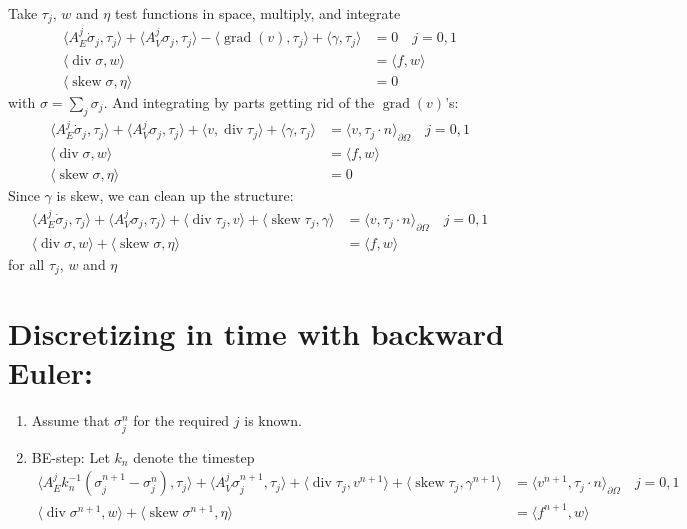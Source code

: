 \documentclass{amsart}
\DeclareMathOperator{\Div}{div}
\DeclareMathOperator{\Grad}{grad}
\DeclareMathOperator{\Skew}{skew}
\newcommand{\inner}[2]{\langle #1, #2 \rangle}
\begin{document}
Take $\tau_j$, $w$ and $\eta$ test functions in space, multiply, and
integrate
\begin{align}
  \inner{A_E^{j} \dot \sigma_j}{\tau_j} + \inner{A_{V}^{j} \sigma_j}{\tau_j} - \inner{\Grad(v)}{\tau_j} + \inner{\gamma}{\tau_j} &= 0
  \quad j = 0, 1 \\
  \inner{\Div \sigma}{w} & = \inner{f}{w} \\
  \inner{\Skew \sigma}{\eta} &= 0
\end{align}
with $\sigma = \sum_j \sigma_j$. And integrating by parts getting rid of the $\Grad(v)$'s:
\begin{align}
  \inner{A_E^{j} \dot \sigma_j}{\tau_j} + \inner{A_{V}^{j} \sigma_j}{\tau_j} + \inner{v}{\Div \tau_j} + \inner{\gamma}{\tau_j}  &= \inner{v}{\tau_j \cdot n}_{\partial \Omega}
  \quad j = 0, 1 \\
  \inner{\Div \sigma}{w} & = \inner{f}{w} \\
  \inner{\Skew \sigma}{\eta} &= 0
\end{align}
Since $\gamma$ is skew, we can clean up the structure:
\begin{align}
  \inner{A_E^{j} \dot \sigma_j}{\tau_j} + \inner{A_{V}^{j} \sigma_j}{\tau_j} + \inner{\Div \tau_j}{v} + \inner{\Skew \tau_j}{\gamma}  &= \inner{v}{\tau_j \cdot n}_{\partial \Omega}
  \quad j = 0, 1 \\
  \inner{\Div \sigma}{w} + \inner{\Skew \sigma}{\eta} & = \inner{f}{w}
\end{align}
for all $\tau_j$, $w$ and $\eta$

\section{Discretizing in time with backward Euler:}

\begin{enumerate}
\item
  Assume that $\sigma_j^{n}$ for the required $j$ is known.
\item
  BE-step: Let $k_n$ denote the timestep
  \begin{align}
    \inner{A_E^{j} k_n^{-1} (\sigma_j^{n+1} - \sigma_j^n)}{\tau_j}
    + \inner{A_{V}^{j} \sigma_j^{n+1}}{\tau_j}
    + \inner{\Div \tau_j}{v^{n+1}}
    + \inner{\Skew \tau_j}{\gamma^{n+1}}
    &= \inner{v^{n+1}}{\tau_j \cdot n}_{\partial \Omega}
    \quad j = 0, 1 \\
    \inner{\Div \sigma^{n+1}}{w} + \inner{\Skew \sigma^{n+1}}{\eta}
    &= \inner{f^{n+1}}{w}
  \end{align}
\end{enumerate}
\end{document}

